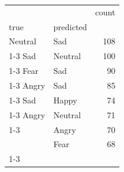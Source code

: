 \begin{tabular}{llr}
\toprule
 &  & count \\
true & predicted &  \\
\midrule
Neutral & Sad & 108 \\
\cline{1-3}
Sad & Neutral & 100 \\
\cline{1-3}
Fear & Sad & 90 \\
\cline{1-3}
Angry & Sad & 85 \\
\cline{1-3}
Sad & Happy & 74 \\
\cline{1-3}
Angry & Neutral & 71 \\
\cline{1-3}
\multirow[t]{2}{*}{Sad} & Angry & 70 \\
 & Fear & 68 \\
\cline{1-3}
\bottomrule
\end{tabular}
